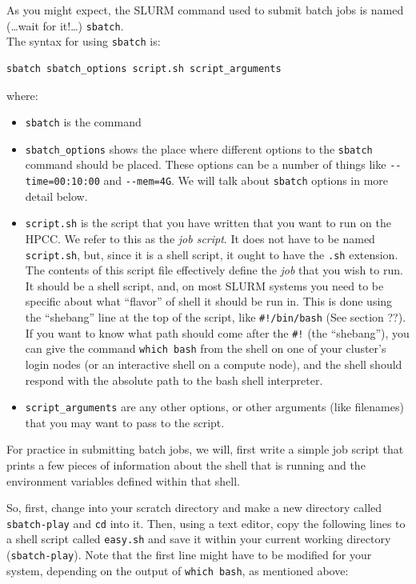 \documentclass[]{krantz}
\providecommand{\tightlist}{%
  \setlength{\itemsep}{0pt}\setlength{\parskip}{0pt}}
\begin{document}
As you might expect, the SLURM command used to submit batch jobs is named (\ldots{}wait for it!\ldots{}) \texttt{sbatch}.\\
The syntax for using \texttt{sbatch} is:

\begin{verbatim}
sbatch sbatch_options script.sh script_arguments
\end{verbatim}

where:

\begin{itemize}
\tightlist
\item
  \texttt{sbatch} is the command
\item
  \texttt{sbatch\_options} shows the place where different options to the \texttt{sbatch} command should
  be placed. These options can be a number of things like \texttt{-\/-time=00:10:00} and \texttt{-\/-mem=4G}.
  We will talk about \texttt{sbatch} options in more detail below.
\item
  \texttt{script.sh} is the script that you have written that you want to run on the HPCC. We refer to this
  as the \emph{job script}. It does not
  have to be named \texttt{script.sh}, but, since it is a shell script, it ought to have the \texttt{.sh} extension.
  The contents of this script file effectively
  define the \emph{job} that you wish to run. It should be a shell script, and, on most SLURM systems
  you need to be specific about what ``flavor'' of shell it should be run in. This is done using the
  ``shebang'' line at the top of the script, like \texttt{\#!/bin/bash} (See section ??). If you want to know what
  path should come after the \texttt{\#!} (the ``shebang''), you can give the command \texttt{which\ bash} from the shell
  on one of your cluster's login nodes (or an interactive shell on a compute node), and the
  shell should respond with the absolute path to the bash shell interpreter.
\item
  \texttt{script\_arguments} are any other options, or other arguments (like filenames) that you
  may want to pass to the script.
\end{itemize}

For practice in submitting batch jobs, we will, first write a simple job script that
prints a few pieces of information about the shell that is running and the environment
variables defined within that shell.

So, first, change into your scratch directory
and make a new directory called \texttt{sbatch-play} and \texttt{cd} into it. Then, using a text editor,
copy the following lines to a shell script called \texttt{easy.sh} and save it within
your current working directory (\texttt{sbatch-play}). Note that the first line might
have to be modified for your system, depending on the output of \texttt{which\ bash}, as mentioned
above:
\end{document}

